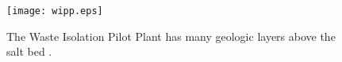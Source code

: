\begin{figure}[htbp!]
  \begin{center}
    \texttt{[image: wipp.eps]}
  \end{center}
  \caption{The Waste Isolation Pilot Plant has many geologic layers above the 
    salt bed \cite{doe_wipp_2013}.}
  \label{fig:wipp}
\end{figure}
